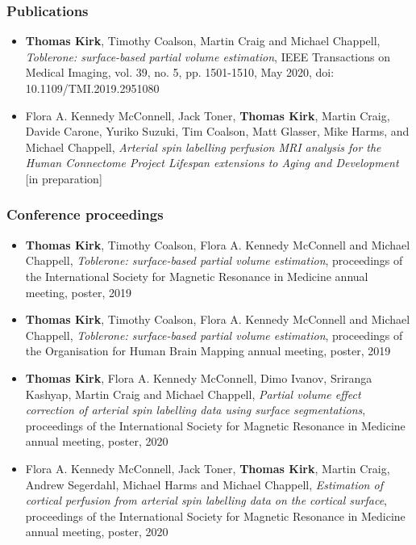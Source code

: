 \subsubsection{Publications} 

\begin{itemize}
\item{\textbf{Thomas Kirk}, Timothy Coalson, Martin Craig and Michael Chappell, \textit{Toblerone: surface-based partial volume estimation}, IEEE Transactions on Medical Imaging, vol. 39, no. 5, pp. 1501-1510, May 2020, doi: 10.1109/TMI.2019.2951080}

\item{Flora A. Kennedy McConnell, Jack Toner, \textbf{Thomas Kirk}, Martin Craig, Davide Carone, Yuriko Suzuki, Tim Coalson, Matt Glasser, Mike Harms, and Michael Chappell, \textit{Arterial spin labelling perfusion MRI analysis for the Human Connectome Project Lifespan extensions to Aging and Development} [in preparation]}
\end{itemize}


\subsubsection{Conference proceedings}

\begin{itemize}

\item{\textbf{Thomas Kirk}, Timothy Coalson, Flora A. Kennedy McConnell and Michael Chappell, \textit{Toblerone: surface-based partial volume estimation}, proceedings of the International Society for Magnetic Resonance in Medicine annual meeting, poster, 2019}

\item{\textbf{Thomas Kirk}, Timothy Coalson, Flora A. Kennedy McConnell and Michael Chappell, \textit{Toblerone: surface-based partial volume estimation}, proceedings of the Organisation for Human Brain Mapping annual meeting, poster, 2019}

\item{\textbf{Thomas Kirk}, Flora A. Kennedy McConnell, Dimo Ivanov, Sriranga Kashyap, Martin Craig and Michael Chappell, \textit{Partial volume effect correction of arterial spin labelling data using surface segmentations}, proceedings of the International Society for Magnetic Resonance in Medicine annual meeting, poster, 2020}

\item{Flora A. Kennedy McConnell, Jack Toner, \textbf{Thomas Kirk}, Martin Craig, Andrew Segerdahl, Michael Harms and Michael Chappell, \textit{Estimation of cortical perfusion from arterial spin labelling data on the cortical surface}, proceedings of the International Society for Magnetic Resonance in Medicine annual meeting, poster, 2020}

\end{itemize}

